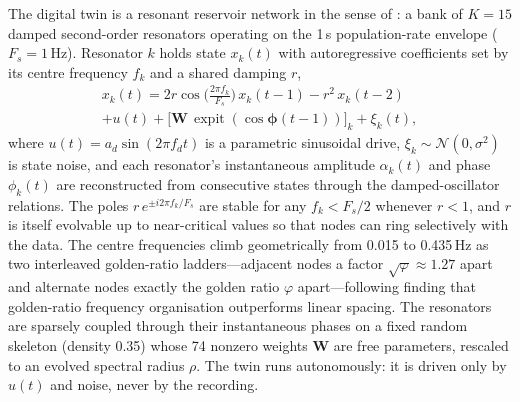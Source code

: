 \documentclass[fullpaper]{nldl}
\begin{document}
The digital twin is a resonant reservoir network in the sense of \citet{kramer2025resonant}: a bank of $K=15$ damped second-order resonators operating on the 1\,s population-rate envelope ($F_s=1$\,Hz). Resonator $k$ holds state $x_k(t)$ with autoregressive coefficients set by its centre frequency $f_k$ and a shared damping $r$,
\begin{multline}
  \label{eq:ar2}
  x_k(t) = 2r\cos\bigl(\tfrac{2\pi f_k}{F_s}\bigr)\,x_k(t-1) - r^2\,x_k(t-2) \\
  + u(t) + \bigl[\mathbf{W}\,\operatorname{expit}(\cos\boldsymbol{\phi}(t-1))\bigr]_k + \xi_k(t),
\end{multline}
where $u(t)=a_d\sin(2\pi f_d t)$ is a parametric sinusoidal drive, $\xi_k\sim\mathcal{N}(0,\sigma^2)$ is state noise, and each resonator's instantaneous amplitude $\alpha_k(t)$ and phase $\phi_k(t)$ are reconstructed from consecutive states through the damped-oscillator relations. The poles $r\,e^{\pm i 2\pi f_k/F_s}$ are stable for any $f_k<F_s/2$ whenever $r<1$, and $r$ is itself evolvable up to near-critical values so that nodes can ring selectively with the data. The centre frequencies climb geometrically from 0.015 to 0.435\,Hz as two interleaved golden-ratio ladders---adjacent nodes a factor $\sqrt{\varphi}\approx1.27$ apart and alternate nodes exactly the golden ratio $\varphi$ apart---following  finding that golden-ratio frequency organisation outperforms linear spacing. The resonators are sparsely coupled through their instantaneous phases on a fixed random skeleton (density 0.35) whose 74 nonzero weights $\mathbf{W}$ are free parameters, rescaled to an evolved spectral radius $\rho$. The twin runs autonomously: it is driven only by $u(t)$ and noise, never by the recording.
\end{document}
